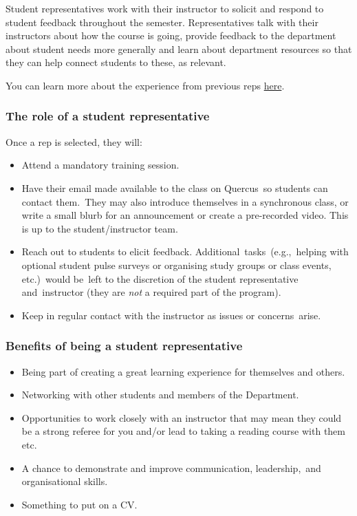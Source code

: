 \documentclass[
  openany]{book}
\begin{document}
Student representatives work with their instructor to solicit and respond to student feedback throughout the semester. Representatives talk with their instructors about how the course is going, provide feedback to the department about student needs more generally and learn about department resources so that they can help connect students to these, as relevant.

You can learn more about the experience from previous reps \href{https://www.statistics.utoronto.ca/news/new-pilot-program-enhances-academic-experience-giving-students-voice}{here}.

\hypertarget{the-role-of-a-student-representative}{%
\subsubsection{The role of a student representative}\label{the-role-of-a-student-representative}}

Once a rep is selected, they will:

\begin{itemize}
\item
  Attend a mandatory training session.
\item
  Have their email made available to the class on Quercus~so students can contact them.~They may also introduce themselves in a synchronous class, or write a small blurb for an announcement or create a pre-recorded video. This is up to the student/instructor team.
\item
  Reach out to students to elicit feedback. Additional~tasks~(e.g.,~helping with optional student pulse surveys or organising study groups or class events, etc.)~would be~left to the discretion of the student representative and~instructor (they are \emph{not} a required part of the program).~~
\item
  Keep in regular contact with the instructor as issues or concerns~arise.
\end{itemize}

\hypertarget{benefits-of-being-a-student-representative}{%
\subsubsection{Benefits of being a student representative}\label{benefits-of-being-a-student-representative}}

\begin{itemize}
\item
  Being part of creating a great learning experience for themselves and others.
\item
  Networking with other students and members of the Department.
\item
  Opportunities to work closely with an instructor that may mean they could be a strong referee for you and/or lead to taking a reading course with them etc.
\item
  A chance to demonstrate and improve communication, leadership,~and organisational skills.
\item
  Something to put on a CV.
\end{itemize}
\end{document}
